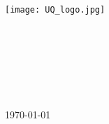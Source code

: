 \begin{titlepage} 
	
	\center %
	
	\texttt{[image: UQ\_logo.jpg]}\\[1.7cm]	
	
	
	\textsc{\LARGE \institution}\\[1.2cm] 
	
	\textsc{\Large \courseCode}\\[0.7cm] 
	
	\textsc{\large \courseTitle}\\[0.7cm] 
	
	\HRule\\[0.65cm]
	
	{\huge\bfseries \documentTitle}\\[0.3cm]
	
	\HRule\\[1.7cm]
	
	\titlepageAuthors
	
	\vfill %
	{\large\today} 
	
	
	\vfill %
	
\end{titlepage}